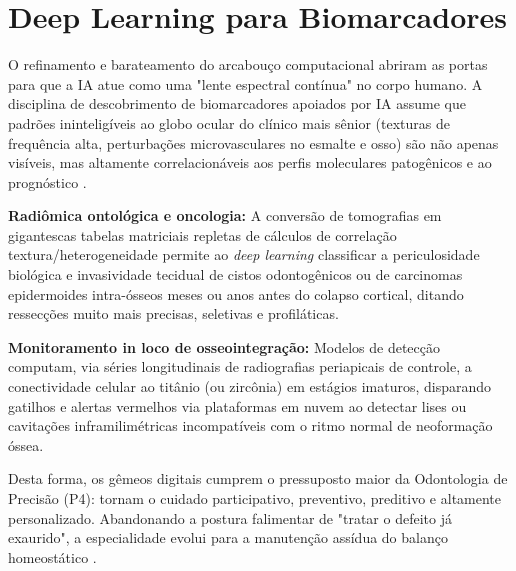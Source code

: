 \section{Deep Learning para Biomarcadores}
\label{sec:ia-biomarcadores}

O refinamento e barateamento do arcabouço computacional abriram as portas para que a IA atue como uma "lente espectral contínua" no corpo humano. A disciplina de descobrimento de biomarcadores apoiados por IA assume que padrões ininteligíveis ao globo ocular do clínico mais sênior (texturas de frequência alta, perturbações microvasculares no esmalte e osso) são não apenas visíveis, mas altamente correlacionáveis aos perfis moleculares patogênicos e ao prognóstico \cite{shen2024}.

\textbf{Radiômica ontológica e oncologia:} A conversão de tomografias em gigantescas tabelas matriciais repletas de cálculos de correlação textura/heterogeneidade permite ao \textit{deep learning} classificar a periculosidade biológica e invasividade tecidual de cistos odontogênicos ou de carcinomas epidermoides intra-ósseos meses ou anos antes do colapso cortical, ditando ressecções muito mais precisas, seletivas e profiláticas.

\textbf{Monitoramento in loco de osseointegração:} Modelos de detecção computam, via séries longitudinais de radiografias periapicais de controle, a conectividade celular ao titânio (ou zircônia) em estágios imaturos, disparando gatilhos e alertas vermelhos via plataformas em nuvem ao detectar lises ou cavitações inframilimétricas incompatíveis com o ritmo normal de neoformação óssea.

Desta forma, os gêmeos digitais cumprem o pressuposto maior da Odontologia de Precisão (P4): tornam o cuidado participativo, preventivo, preditivo e altamente personalizado. Abandonando a postura falimentar de "tratar o defeito já exaurido", a especialidade evolui para a manutenção assídua do balanço homeostático \cite{technologysociety2025}.
